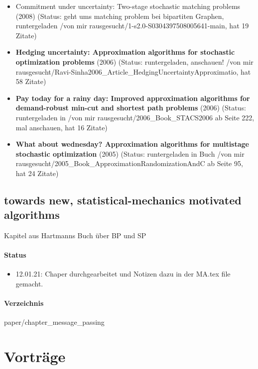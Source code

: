 \documentclass[paper=a4,10pt]{scrartcl}
\begin{document}
\begin{itemize}
\item  Commitment under uncertainty: Two-stage stochastic matching problems (2008) (Status: geht ums matching problem bei bipartiten Graphen, runtergeladen /von mir rausgesucht/1-s2.0-S0304397508005641-main, hat 19 Zitate)
\item  \textbf{Hedging uncertainty: Approximation algorithms for stochastic optimization problems} (2006) (Status: runtergeladen, anschauen! /von mir rausgesucht/Ravi-Sinha2006\_Article\_HedgingUncertaintyApproximatio, hat 58 Zitate)
\item  \textbf{Pay today for a rainy day: Improved approximation algorithms for demand-robust min-cut and shortest path problems} (2006) (Status: runtergeladen in /von mir rausgesucht/2006\_Book\_STACS2006 ab Seite 222, mal anschauen, hat 16 Zitate)
\item  \textbf{What about wednesday? Approximation algorithms for multistage stochastic optimization} (2005) (Status: runtergeladen in Buch /von mir rausgesucht/2005\_Book\_ApproximationRandomizationAndC ab Seite 95, hat 24 Zitate)
\end{itemize}

\subsection{towards new, statistical-mechanics motivated algorithms}
Kapitel aus Hartmanns Buch über BP und SP

\paragraph{Status}
\begin{itemize}
\item 12.01.21: Chaper durchgearbeitet und Notizen dazu in der MA.tex file gemacht.
\end{itemize}
\paragraph{Verzeichnis} paper/chapter\_message\_passing

\section{Vorträge}
\end{document}
